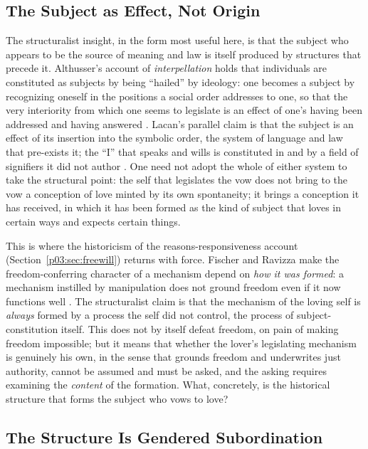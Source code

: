 \documentclass[11pt,a4paper]{article}
\begin{document}
\subsection{The Subject as Effect, Not Origin}

The structuralist insight, in the form most useful here, is that the subject who appears to be the source of meaning and law is itself produced by structures that precede it. Althusser's account of \emph{interpellation} holds that individuals are constituted as subjects by being ``hailed'' by ideology: one becomes a subject by recognizing oneself in the positions a social order addresses to one, so that the very interiority from which one seems to legislate is an effect of one's having been addressed and having answered \parencite{althusser1971ideology}. Lacan's parallel claim is that the subject is an effect of its insertion into the symbolic order, the system of language and law that pre-exists it; the ``I'' that speaks and wills is constituted in and by a field of signifiers it did not author \parencite{lacan2006ecrits}. One need not adopt the whole of either system to take the structural point: the self that legislates the vow does not bring to the vow a conception of love minted by its own spontaneity; it brings a conception it has received, in which it has been formed as the kind of subject that loves in certain ways and expects certain things.

This is where the historicism of the reasons-responsiveness account (Section~\ref{p03:sec:freewill}) returns with force. Fischer and Ravizza make the freedom-conferring character of a mechanism depend on \emph{how it was formed}: a mechanism instilled by manipulation does not ground freedom even if it now functions well \parencite{fischer1998responsibility}. The structuralist claim is that the mechanism of the loving self is \emph{always} formed by a process the self did not control, the process of subject-constitution itself. This does not by itself defeat freedom, on pain of making freedom impossible; but it means that whether the lover's legislating mechanism is genuinely his own, in the sense that grounds freedom and underwrites just authority, cannot be assumed and must be asked, and the asking requires examining the \emph{content} of the formation. What, concretely, is the historical structure that forms the subject who vows to love?

\subsection{The Structure Is Gendered Subordination}
\end{document}
